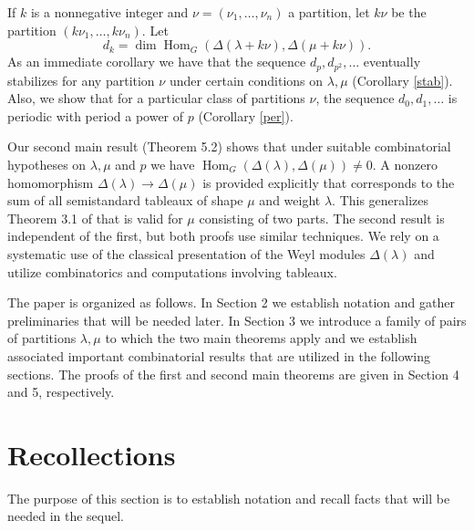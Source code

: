 \documentclass[11pt]{article}
\theoremstyle{definition}
\numberwithin{equation}{section}
\DeclareMathOperator{\Hom}{Hom}
\numberwithin{equation}{section}
\begin{document}
If $k$ is a nonnegative integer and $\nu=(\nu_1,\dots,\nu_n)$ a partition, let $k\nu$ be the partition $(k\nu_1,\dots,k\nu_n).$ Let \[d_k=\dim \Hom _{G}(\Delta (\lambda + k \nu), \Delta(\mu + k \nu)).\]As an immediate corollary we have  that the sequence $d_{p}, d_{p^2}, \dots$ eventually stabilizes for any partition $\nu$ under certain conditions on $\lambda, \mu$ (Corollary \ref{stab}). Also, we show that for a particular class of partitions $\nu$, the sequence $d_{0}, d_1, \dots$ is periodic with period a power of $p$ (Corollary \ref{per}).

Our second main result (Theorem 5.2) shows that under suitable combinatorial hypotheses on $\lambda, \mu$ and $p$ we have $\Hom_G(\Delta(\lambda), \Delta(\mu)) \neq 0$. A nonzero homomorphism $\Delta (\lambda) \to \Delta (\mu)$ is provided explicitly that corresponds to the sum of all semistandard tableaux of shape $\mu$ and weight $\lambda$. This generalizes Theorem 3.1 of \cite{MS3} that is valid for $\mu$ consisting of two parts. The second result is independent of the first, but both proofs use similar techniques. We rely on a systematic use of the classical presentation of the Weyl modules $\Delta(\lambda)$ and utilize combinatorics and computations involving tableaux.

The paper is organized as follows. In Section 2 we establish notation and gather preliminaries that will be needed later. In Section 3 we introduce a family of pairs of partitions $\lambda, \mu$ to which the two main theorems apply and we establish associated important combinatorial results that are utilized in the following sections. The proofs of the first and second main theorems are given in Section 4 and 5, respectively.

\section{Recollections}
The purpose of this section is to establish notation and recall facts that will be needed in the sequel.
\end{document}
